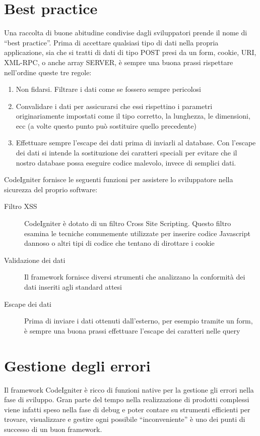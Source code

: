 \section*{Best practice}
Una raccolta di buone abitudine condivise dagli sviluppatori prende il nome di ``best practice''. Prima di accettare qualsiasi tipo di dati nella propria applicazione, sia che si tratti di dati di tipo POST presi da un form, cookie, URI, XML-RPC, o anche array SERVER, è sempre una buona prassi rispettare nell'ordine queste tre regole:

\begin{enumerate}
\item Non fidarsi. Filtrare i dati come se fossero sempre pericolosi
\item Convalidare i dati per assicurarsi che essi rispettino i parametri originariamente impostati come il tipo corretto, la lunghezza, le dimensioni, ecc (a volte questo punto può sostituire quello precedente)
\item Effettuare sempre l'escape dei dati prima di inviarli al database. Con l'escape dei dati si intende la sostituzione dei caratteri speciali per evitare che il nostro database possa eseguire codice malevolo, invece di semplici dati.
\end{enumerate}

CodeIgniter fornisce le seguenti funzioni per assistere lo sviluppatore nella sicurezza del proprio software:

\begin{description}
\item[Filtro XSS] CodeIgniter è dotato di un filtro Cross Site Scripting. Questo filtro esamina le tecniche comunemente utilizzate per inserire codice Javascript dannoso o altri tipi di codice che tentano di dirottare i cookie 
\item[Validazione dei dati] Il framework fornisce diversi strumenti che analizzano la conformità dei dati inseriti agli standard attesi
\item[Escape dei dati] Prima di inviare i dati ottenuti dall'esterno, per esempio tramite un form, è sempre una buona prassi effettuare l'escape dei caratteri nelle query
\end{description}

\section*{Gestione degli errori}
Il framework CodeIgniter è ricco di funzioni native per la gestione gli errori nella fase di sviluppo. Gran parte del tempo nella realizzazione di prodotti complessi viene infatti speso nella fase di debug e poter contare su strumenti efficienti per trovare, visualizzare e gestire ogni possibile ``inconveniente'' è uno dei punti di successo di un buon framework. 

